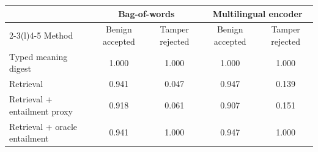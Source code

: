 \begin{tabular}{@{}lcccc@{}}
\toprule
 & \multicolumn{2}{c}{Bag-of-words} & \multicolumn{2}{c}{Multilingual encoder} \\
\cmidrule(lr){2-3}\cmidrule(l){4-5}
Method & Benign accepted & Tamper rejected & Benign accepted & Tamper rejected \\
\midrule
Typed meaning digest & 1.000 & 1.000 & 1.000 & 1.000 \\
Retrieval & 0.941 & 0.047 & 0.947 & 0.139 \\
Retrieval + entailment proxy & 0.918 & 0.061 & 0.907 & 0.151 \\
Retrieval + oracle entailment & 0.941 & 1.000 & 0.947 & 1.000 \\
\bottomrule
\end{tabular}
